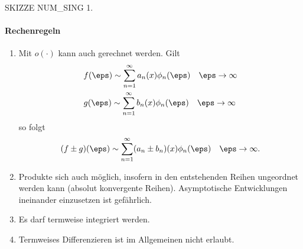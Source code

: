 SKIZZE NUM\_SING 1. 

\paragraph{Rechenregeln}
\label{sec:rechenregeln}
\begin{enumerate}
\item 
Mit $o(\cdot)$ kann auch gerechnet werden. Gilt 
\begin{align*}
  &f(\eps) \sim \sum_{n =1}^{\infty}a_{n}(x)\phi_{n}(\eps) \quad \eps \to \infty\\
  &g(\eps) \sim \sum_{n =1}^{\infty}b_{n}(x)\phi_{n}(\eps) \quad \eps \to \infty
\end{align*}
so folgt
\begin{align*}
    (f\pm g)(\eps) \sim \sum_{n =1}^{\infty}(a_{n}\pm b_{n})(x)\phi_{n}(\eps) \quad \eps \to \infty. 
\end{align*}
\item Produkte sich auch möglich, insofern in den entstehenden Reihen ungeordnet werden kann (absolut konvergente Reihen). Asymptotische Entwicklungen ineinander einzusetzen ist gefährlich. 
\item Es darf termweise integriert werden. 
\item Termweises Differenzieren ist im Allgemeinen nicht erlaubt. 
\end{enumerate}
